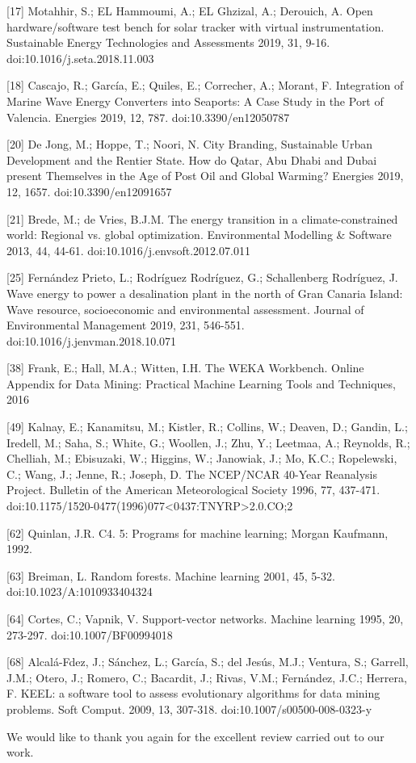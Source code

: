 \documentclass[a4paper,twoside,11pt]{article}
\begin{document}
{[17] Motahhir, S.; EL Hammoumi, A.; EL Ghzizal, A.; Derouich, A. Open hardware/software test bench for solar tracker with virtual instrumentation. Sustainable Energy Technologies and Assessments 2019, 31, 9-16. doi:10.1016/j.seta.2018.11.003
    
[18] Cascajo, R.; García, E.; Quiles, E.; Correcher, A.; Morant, F. Integration of Marine Wave Energy Converters into Seaports: A Case Study in the Port of Valencia. Energies 2019, 12, 787. doi:10.3390/en12050787    

[20] De Jong, M.; Hoppe, T.; Noori, N. City Branding, Sustainable Urban Development and the Rentier State. How do Qatar, Abu Dhabi and Dubai present Themselves in the Age of Post Oil and Global Warming? Energies 2019, 12, 1657. doi:10.3390/en12091657
    
[21] Brede, M.; de Vries, B.J.M. The energy transition in a climate-constrained world: Regional vs. global optimization. Environmental Modelling \& Software 2013, 44, 44-61. \newline doi:10.1016/j.envsoft.2012.07.011    
        
[25] Fernández Prieto, L.; Rodríguez Rodríguez, G.; Schallenberg Rodríguez, J. Wave energy to power a desalination plant in the north of Gran Canaria Island: Wave resource, socioeconomic and environmental assessment. Journal of Environmental Management 2019, 231, 546-551. doi:10.1016/j.jenvman.2018.10.071   
    
[38] Frank, E.; Hall, M.A.; Witten, I.H. The WEKA Workbench. Online Appendix for Data Mining: Practical Machine Learning Tools and Techniques, 2016
    
[49] Kalnay, E.; Kanamitsu, M.; Kistler, R.; Collins, W.; Deaven, D.; Gandin, L.; Iredell, M.; Saha, S.; White, G.; Woollen, J.; Zhu, Y.; Leetmaa, A.; Reynolds, R.; Chelliah, M.; Ebisuzaki, W.; Higgins, W.; Janowiak, J.; Mo, K.C.; Ropelewski, C.; Wang, J.; Jenne, R.; Joseph, D. The NCEP/NCAR 40-Year Reanalysis Project. Bulletin of the American Meteorological Society 1996, 77, 437-471. doi:10.1175/1520-0477(1996)077<0437:TNYRP>2.0.CO;2
    
[62] Quinlan, J.R. C4. 5: Programs for machine learning; Morgan Kaufmann, 1992.   
    
[63] Breiman, L. Random forests. Machine learning 2001, 45, 5-32. doi:10.1023/A:1010933404324
    
[64] Cortes, C.; Vapnik, V. Support-vector networks. Machine learning 1995, 20, 273-297. doi:10.1007/BF00994018
    
[68] Alcalá-Fdez, J.; Sánchez, L.; García, S.; del Jesús, M.J.; Ventura, S.; Garrell, J.M.; Otero, J.; Romero, C.; Bacardit, J.; Rivas, V.M.; Fernández, J.C.; Herrera, F. KEEL: a software tool to assess evolutionary algorithms for data mining problems. Soft Comput. 2009, 13, 307-318. doi:10.1007/s00500-008-0323-y    


\vspace{0.5cm}
We would like to thank you again for the excellent review carried out to our work.
}
\end{document}
